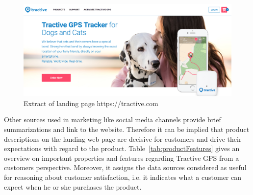 \begin{figure}
	\centering
	\includegraphics[width=1.0\textwidth]{img/tractiveLanding.png}
	\caption{Extract of landing page https://tractive.com}
	\label{fig:tractiveLanding}
\end{figure} 

Other sources used in marketing like social media channels provide brief summarizations and link to the website. Therefore it can be implied that product descriptions on the landing web page are decisive for customers and drive their expectations with regard to the product. Table~\ref{tab:productFeatures} gives an overview on important properties and features regarding Tractive GPS from a customers perspective. Moreover, it assigns the data sources considered as useful for reasoning about customer satisfaction, i.e. it indicates what a customer can expect when he or she purchases the product.

